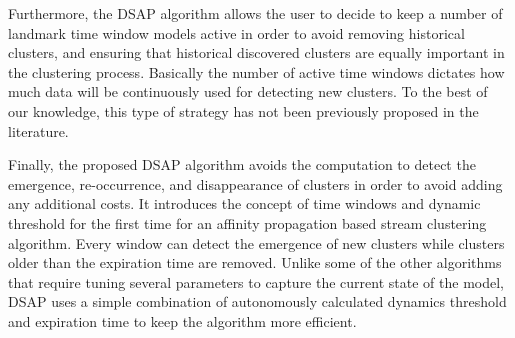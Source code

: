 Furthermore, the DSAP algorithm allows the user to decide to keep a number of landmark time window models active in order to avoid removing historical clusters, and ensuring that historical discovered clusters are equally important in the clustering process. Basically the number of active time windows dictates how much data will be continuously used for detecting new clusters. To the best of our knowledge, this type of strategy has not been previously proposed in the literature.




Finally, the proposed DSAP algorithm avoids the computation to detect the emergence, re-occurrence, and disappearance of clusters in order to avoid adding any additional costs. It introduces the concept of time windows and dynamic threshold for the first time for an affinity propagation based stream clustering algorithm. Every window can detect the emergence of new clusters while clusters older than the expiration time are removed. Unlike some of the other algorithms that require tuning several parameters to capture the current state of the model, DSAP uses a simple combination of autonomously calculated dynamics threshold and expiration time to keep the algorithm more efficient.



 







